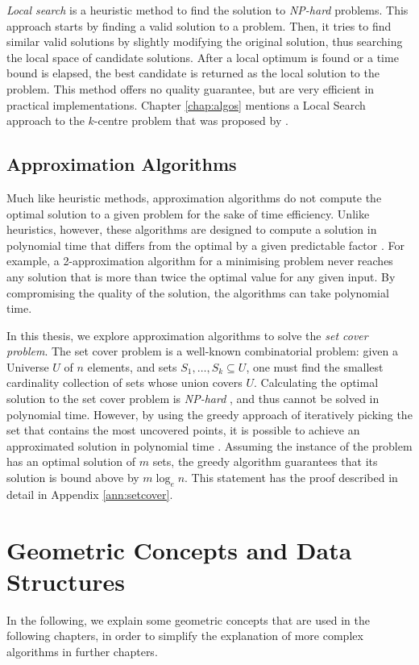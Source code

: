 \emph{Local search} is a heuristic method to find the solution to \emph{NP-hard} problems. This approach starts by finding a valid solution to a problem. Then, it tries to find similar valid solutions by slightly modifying the original solution, thus searching the local space of candidate solutions. After a local optimum is found or a time bound is elapsed, the best candidate is returned as the local solution to the problem. This method offers no quality guarantee, but are very efficient in practical implementations. Chapter \ref{chap:algos} mentions a Local Search approach to the $k$-centre problem that was proposed by \citet{incrementalcov}.

\subsection{Approximation Algorithms}
Much like heuristic methods, approximation algorithms do not compute the optimal solution to a given problem for the sake of time efficiency. Unlike heuristics, however, these algorithms are designed to compute a solution in polynomial time that differs from the optimal by a given predictable factor \cite{approxalgos}. For example, a 2-approximation algorithm for a minimising problem never reaches any solution that is more than twice the optimal value for any given input. By compromising the quality of the solution, the algorithms can take polynomial time. 

In this thesis, we explore approximation algorithms to solve the \emph{set cover problem}. The set cover problem is a well-known combinatorial problem: given a Universe $U$ of $n$ elements, and sets $S_1,\dotsc,S_k \subseteq U$, one must find the smallest cardinality collection of sets whose union covers $U$. Calculating the optimal solution to the set cover problem is \emph{NP-hard} \cite{gdccomplex}, and thus cannot be solved in polynomial time. However, by using the greedy approach of iteratively picking the set that contains the most uncovered points, it is possible to achieve an approximated solution in polynomial time \cite{approxalgos}. Assuming the instance of the problem has an optimal solution of $m$ sets, the greedy algorithm guarantees that its solution is bound above by $m \log_e n$. This statement has the proof described in detail in Appendix \ref{ann:setcover}.

\section{Geometric Concepts and Data Structures}
In the following, we explain some geometric concepts that are used in the following chapters, in order to simplify the explanation of more complex algorithms in further chapters.
